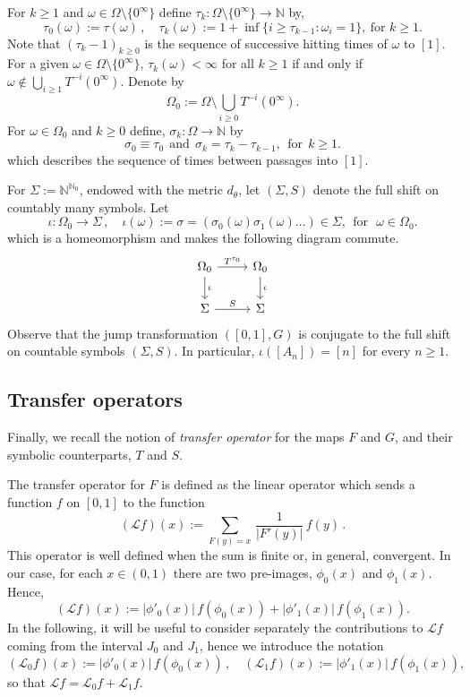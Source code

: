 \documentclass{amsart}
\theoremstyle{definition}
\theoremstyle{remark}
\theoremstyle{definition}
\numberwithin{equation}{section}
\newcommand{\N}{\mathbb N}
\newcommand{\CL}{{\mathcal L}}
\begin{document}
For $k \ge 1$ and $\omega \in \Omega \setminus \{ 0^{\infty}\}$ define $\tau_{k} : \Omega \setminus \{ 0^{\infty}\} \to \N$ by,
\[
\tau_0(\omega) := \tau(\omega)\, ,\quad  \tau_{k}(\omega) := 1+ \inf \{ i \ge \tau_{k-1} : \omega_{i} = 1\}, \ \text{for } k \ge 1.
\]
Note that $(\tau_{k}-1)_{k \ge 0}$ is the sequence of successive hitting times of $\omega$ to $[1]$. For a given $\omega \in \Omega \setminus \{0^{\infty}\}$, $\tau_{k}(\omega) < \infty$ for all $k \ge 1$ if and only if $\omega \notin \bigcup_{i \ge 1} T^{-i}(0^{\infty}) $. Denote by 
\[
\Omega_{0}:= \Omega \setminus \bigcup\limits_{i \ge 0} T^{-i}(0^{\infty}).
\]
For $\omega \in \Omega_{0} $ and $k \ge 0$ define, $\sigma_{k} : \Omega \to \N$ by
    \[
        \sigma_{0} \equiv \tau_{0} \ \ \text{and} \ \  \sigma_{k} = \tau_{k} - \tau_{k-1}, \ \ \text{for} \ \ k \ge 1.
    \] 
which describes the sequence of times between passages into $[1]$. 

For $\Sigma := \N^{\N_0}$, endowed with the metric $d_\theta$, let $(\Sigma,S)$ denote the full shift on countably many symbols. Let 
\begin{equation} \label{iota}
       \iota : \Omega_{0} \longrightarrow \Sigma\, ,\quad  \iota(\omega):= \sigma =(\sigma_{0}(\omega) \sigma_{1}(\omega) \dots) \in \Sigma , \ \ \text{for} \ \ \ \omega \in \Omega_{0} .
\end{equation}
which is a homeomorphism and makes the following diagram commute.
    \[
        \begin{tikzcd}
         \Omega_{0} \arrow[r, "T^{\tau_{0}}"] \arrow[d, " \iota "]
        & \Omega_{0} \arrow[d, "\iota"] \\
        \Sigma \arrow[r, "S" ]
        & \Sigma
        \end{tikzcd}
     \]
Observe that the jump transformation $([0,1], G)$ is conjugate to the full shift on countable symbols $(\Sigma, S)$. In particular, $\iota([A_{n}]) = [n]$ for every $n \ge 1$.

\subsection{Transfer operators}
Finally, we recall the notion of \emph{transfer operator} for the maps $F$ and $G$, and their symbolic counterparts, $T$ and $S$. 

The transfer operator for $F$ is defined as the linear operator which sends a function $f$ on $[0,1]$ to the function
\[
(\CL f)(x) := \sum_{F(y)=x}\, \frac{1}{|F'(y)|}\, f(y)\, .
\]
This operator is well defined when the sum is finite or, in general, convergent. In our case, for each $x\in (0,1)$ there are two pre-images, $\phi_0(x)$ and $\phi_1(x)$. Hence,
\[
        (\CL f)(x) := |\phi'_{0}(x)|\, f(\phi_{0}(x)) + |\phi'_{1}(x)| \,f(\phi_{1}(x)).
\]
In the following, it will be useful to consider separately the contributions to $\CL f$ coming from the interval $J_0$ and $J_1$, hence we introduce the notation
\[
        (\CL_0 f)(x) := |\phi'_{0}(x)|\, f(\phi_{0}(x))\, ,\quad (\CL_1 f)(x) := |\phi'_{1}(x)| \,f(\phi_{1}(x)),
\]
so that $\CL f = \CL_0 f + \CL_1 f$.
\end{document}
